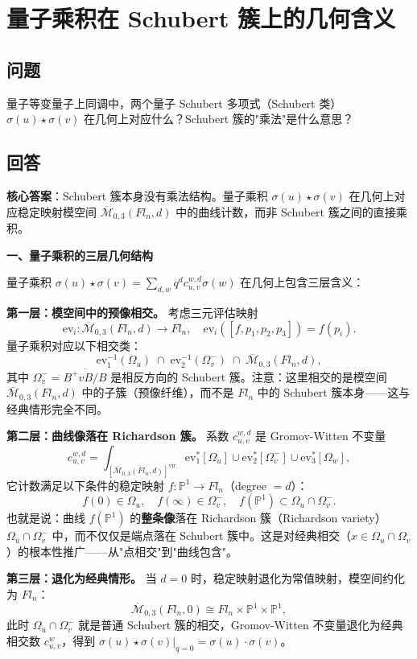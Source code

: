 \section{量子乘积在 Schubert 簇上的几何含义}\label{sec:qa-quantum-product-Schubert-variety}
\subsection{问题}
量子等变量子上同调中，两个量子 Schubert 多项式（Schubert 类）$\sigma(u) \star \sigma(v)$ 在几何上对应什么？Schubert 簇的"乘法"是什么意思？
\subsection{回答}
\textbf{核心答案}：Schubert 簇本身没有乘法结构。量子乘积 $\sigma(u) \star \sigma(v)$ 在几何上对应稳定映射模空间 $\overline{\mathcal{M}}_{0,3}(Fl_n,d)$ 中的曲线计数，而非 Schubert 簇之间的直接乘积。

\textbf{一、量子乘积的三层几何结构}

量子乘积 $\sigma(u) \star \sigma(v) = \sum_{d,w} q^d c_{u,v}^{w,d} \sigma(w)$ 在几何上包含三层含义：

\textbf{第一层：模空间中的预像相交。} 考虑三元评估映射
$$\mathrm{ev}_i : \overline{\mathcal{M}}_{0,3}(Fl_n,d) \to Fl_n, \quad \mathrm{ev}_i([f,p_1,p_2,p_3]) = f(p_i).$$
量子乘积对应以下相交类：
$$\mathrm{ev}_1^{-1}(\Omega_u) \;\cap\; \mathrm{ev}_2^{-1}(\Omega_v^-) \;\cap\; \overline{\mathcal{M}}_{0,3}(Fl_n,d),$$
其中 $\Omega_v^- = \overline{B^+ v B/B}$ 是相反方向的 Schubert 簇。注意：这里相交的是模空间 $\overline{\mathcal{M}}_{0,3}(Fl_n,d)$ 中的子簇（预像纤维），而不是 $Fl_n$ 中的 Schubert 簇本身——这与经典情形完全不同。

\textbf{第二层：曲线像落在 Richardson 簇。} 系数 $c_{u,v}^{w,d}$ 是 Gromov-Witten 不变量
$$c_{u,v}^{w,d} = \int_{[\overline{\mathcal{M}}_{0,3}(Fl_n,d)]^{\mathrm{vir}}} \mathrm{ev}_1^*[\Omega_u] \cup \mathrm{ev}_2^*[\Omega_v^-] \cup \mathrm{ev}_3^*[\Omega_w],$$
它计数满足以下条件的稳定映射 $f: \mathbb{P}^1 \to Fl_n$（degree $= d$）：
$$f(0) \in \Omega_u, \quad f(\infty) \in \Omega_v^-, \quad f(\mathbb{P}^1) \subset \Omega_u \cap \Omega_v^-.$$
也就是说：曲线 $f(\mathbb{P}^1)$ 的\textbf{整条像}落在 Richardson 簇（Richardson variety）$\Omega_u \cap \Omega_v^-$ 中，而不仅仅是端点落在 Schubert 簇中。这是对经典相交（$x \in \Omega_u \cap \Omega_v$）的根本性推广——从"点相交"到"曲线包含"。

\textbf{第三层：退化为经典情形。} 当 $d = 0$ 时，稳定映射退化为常值映射，模空间约化为 $Fl_n$：
$$\overline{\mathcal{M}}_{0,3}(Fl_n, 0) \cong Fl_n \times \mathbb{P}^1 \times \mathbb{P}^1,$$
此时 $\Omega_u \cap \Omega_v^-$ 就是普通 Schubert 簇的相交，Gromov-Witten 不变量退化为经典相交数 $c_{u,v}^w$，得到 $\sigma(u) \star \sigma(v) \big|_{q=0} = \sigma(u) \cdot \sigma(v)$。

